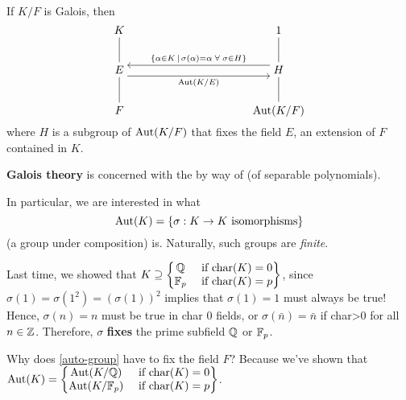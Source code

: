 \documentclass[12pt]{article}
\begin{document}
\begin{theorem}
    \hfill

    If $K/F$ is Galois, then
    \[\begin{tikzcd}[ampersand replacement=\&,cramped,column sep=large,row sep=2.25em]
        K \&\&\& 1 \\
        E \&\&\& H \\
        F \&\&\& {\mathrm{Aut}(K/F)}
        \arrow["{\{\alpha\in K\, \mid\, \sigma(\alpha)=\alpha\; \forall\; \sigma\in H\}}"', shift right=2, from=2-4, to=2-1]
        \arrow["{\mathrm{Aut}(K/E)}"', shift right=2, from=2-1, to=2-4]
        \arrow[no head, from=1-1, to=2-1]
        \arrow[no head, from=2-1, to=3-1]
        \arrow[no head, from=1-4, to=2-4]
        \arrow[no head, from=2-4, to=3-4]
    \end{tikzcd}\]
    where $H$ is a subgroup of $\operatorname{Aut}(K/F)$ that fixes the field $E$, an extension of $F$ contained in $K$.
\end{theorem}

\spl
{}
\begin{tcolorbox}
    \textbf{Galois theory} is concerned with the  by way of  (of separable polynomials).

    In particular, we are interested in what $$\operatorname{Aut}(K)=\{\sigma:K\to K \text{ isomorphisms}\}$$ (a group under composition) is. Naturally, such groups are \textit{finite}.
\end{tcolorbox}
\spl

Last time, we showed that $K\supseteq \left\{\begin{matrix}
    \mathbb{Q} & \text{ if char}(K)=0\\
    \mathbb{F}_p &\text{ if char}(K)=p
\end{matrix}\right\}$, since $\sigma(1)=\sigma(1^2)=(\sigma(1))^2$ implies that $\sigma(1)=1$ must always be true! Hence, $\sigma(n)=n$ must be true in char 0 fields, or $\sigma(\bar n)=\bar n$ if char>0 for all $n\in \mathbb{Z}$. Therefore, $\sigma$ \textbf{fixes} the prime subfield $\mathbb{Q}$ or $\mathbb{F}_p$.

\rmk Why does \cref{auto-group} have to fix the field $F$? Because we've shown that $\operatorname{Aut}(K)=\left\{\begin{matrix}
    \operatorname{Aut}(K/\mathbb{Q}) & \text{ if char}(K)=0\\
    \operatorname{Aut}(K/\mathbb{F}_p) &\text{ if char}(K)=p
\end{matrix}\right\}$.
\end{document}

